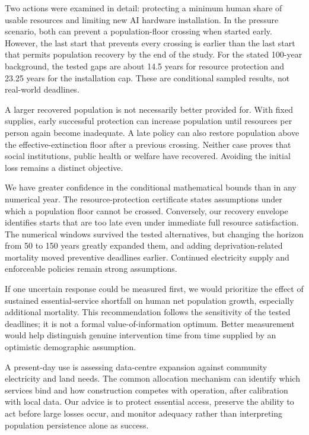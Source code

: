 \documentclass[12pt,a4paper]{article}
\theoremstyle{remark}
\begin{document}
Two actions were examined in detail: protecting a minimum human share of usable resources and limiting new AI hardware installation. In the pressure scenario, both can prevent a population-floor crossing when started early. However, the last start that prevents every crossing is earlier than the last start that permits population recovery by the end of the study. For the stated 100-year background, the tested gaps are about 14.5 years for resource protection and 23.25 years for the installation cap. These are conditional sampled results, not real-world deadlines.

A larger recovered population is not necessarily better provided for. With fixed supplies, early successful protection can increase population until resources per person again become inadequate. A late policy can also restore population above the effective-extinction floor after a previous crossing. Neither case proves that social institutions, public health or welfare have recovered. Avoiding the initial loss remains a distinct objective.

We have greater confidence in the conditional mathematical bounds than in any numerical year. The resource-protection certificate states assumptions under which a population floor cannot be crossed. Conversely, our recovery envelope identifies starts that are too late even under immediate full resource satisfaction. The numerical windows survived the tested alternatives, but changing the horizon from 50 to 150 years greatly expanded them, and adding deprivation-related mortality moved preventive deadlines earlier. Continued electricity supply and enforceable policies remain strong assumptions.

If one uncertain response could be measured first, we would prioritize the effect of sustained essential-service shortfall on human net population growth, especially additional mortality. This recommendation follows the sensitivity of the tested deadlines; it is not a formal value-of-information optimum. Better measurement would help distinguish genuine intervention time from time supplied by an optimistic demographic assumption.

A present-day use is assessing data-centre expansion against community electricity and land needs. The common allocation mechanism can identify which services bind and how construction competes with operation, after calibration with local data. Our advice is to protect essential access, preserve the ability to act before large losses occur, and monitor adequacy rather than interpreting population persistence alone as success.
\end{document}
